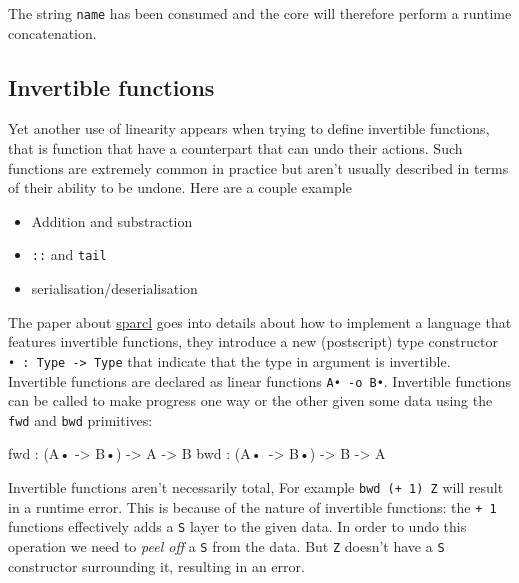 \documentclass[
]{article}
\newenvironment{Shaded}{}{}
\newcommand{\DataTypeTok}[1]{\textcolor[rgb]{0.56,0.13,0.00}{#1}}
\newcommand{\NormalTok}[1]{#1}
\newcommand{\OperatorTok}[1]{\textcolor[rgb]{0.40,0.40,0.40}{#1}}
\newcommand{\OtherTok}[1]{\textcolor[rgb]{0.00,0.44,0.13}{#1}}
\providecommand{\tightlist}{%
  \setlength{\itemsep}{0pt}\setlength{\parskip}{0pt}}
\begin{document}
The string \texttt{name} has been consumed and the core will therefore
perform a runtime concatenation.

\hypertarget{invertible-functions}{%
\subsection{Invertible functions}\label{invertible-functions}}

Yet another use of linearity appears when trying to define invertible
functions, that is function that have a counterpart that can undo their
actions. Such functions are extremely common in practice but aren't
usually described in terms of their ability to be undone. Here are a
couple example

\begin{itemize}
\tightlist
\item
  Addition and substraction
\item
  \texttt{::} and \texttt{tail}
\item
  serialisation/deserialisation
\end{itemize}

The paper about
\href{https://icfp20.sigplan.org/details/icfp-2020-papers/28/Sparcl-A-Language-for-Partially-Invertible-Computation}{sparcl}
goes into details about how to implement a language that features
invertible functions, they introduce a new (postscript) type constructor
\texttt{•\ :\ Type\ -\textgreater{}\ Type} that indicate that the type
in argument is invertible. Invertible functions are declared as linear
functions \texttt{A•\ -o\ B•}. Invertible functions can be called to
make progress one way or the other given some data using the
\texttt{fwd} and \texttt{bwd} primitives:

\begin{Shaded}
\begin{Highlighting}[]
\NormalTok{fwd }\OperatorTok{:}\NormalTok{ (}\DataTypeTok{A}\NormalTok{• }\OtherTok{{-}\textgreater{}} \DataTypeTok{B}\NormalTok{•) }\OtherTok{{-}\textgreater{}} \DataTypeTok{A} \OtherTok{{-}\textgreater{}} \DataTypeTok{B}
\NormalTok{bwd }\OperatorTok{:}\NormalTok{ (}\DataTypeTok{A}\NormalTok{• }\OtherTok{{-}\textgreater{}} \DataTypeTok{B}\NormalTok{•) }\OtherTok{{-}\textgreater{}} \DataTypeTok{B} \OtherTok{{-}\textgreater{}} \DataTypeTok{A}
\end{Highlighting}
\end{Shaded}

Invertible functions aren't necessarily total, For example
\texttt{bwd\ (+\ 1)\ Z} will result in a runtime error. This is because
of the nature of invertible functions: the \texttt{+\ 1} functions
effectively adds a \texttt{S} layer to the given data. In order to undo
this operation we need to \emph{peel off} a \texttt{S} from the data.
But \texttt{Z} doesn't have a \texttt{S} constructor surrounding it,
resulting in an error.
\end{document}
